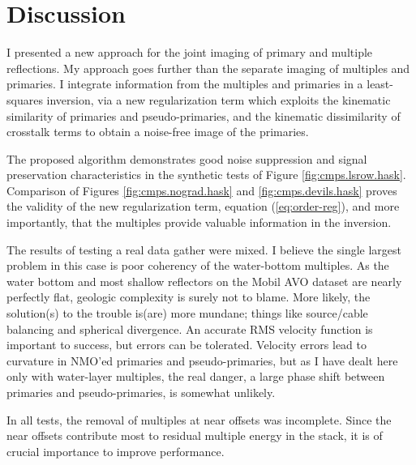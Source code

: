 \section{Discussion}
I presented a new approach for the joint imaging of primary and multiple reflections.  
My approach goes further than the separate imaging of multiples and primaries.  I integrate information
from the multiples and primaries in a least-squares inversion, via a new regularization term which
exploits the kinematic similarity of primaries and pseudo-primaries, and the kinematic dissimilarity
of crosstalk terms to obtain a noise-free image of the primaries.
\par
The proposed algorithm demonstrates good noise suppression and signal preservation characteristics in 
the synthetic tests of Figure \ref{fig:cmps.lsrow.hask}.  Comparison of Figures \ref{fig:cmps.nograd.hask}
and \ref{fig:cmps.devils.hask} proves the validity of the new regularization term, equation 
(\ref{eq:order-reg}), and more importantly, that the multiples provide valuable information in the inversion.
\par
The results of testing a real data gather were mixed.  I believe the single largest problem in this case is
poor coherency of the water-bottom multiples.  As the water bottom and most shallow reflectors on the
Mobil AVO dataset are nearly perfectly flat, geologic complexity is surely not to blame.  More likely, the
solution(s) to the trouble is(are) more mundane; things like source/cable balancing and spherical 
divergence.  An accurate RMS velocity function is important to success, but errors can be tolerated.   
Velocity errors lead to curvature in NMO'ed primaries and pseudo-primaries, but as I have dealt here only 
with water-layer multiples, the real danger, a large phase shift between primaries and pseudo-primaries,
is somewhat unlikely.
\par
In all tests, the removal of multiples at near offsets was incomplete.  Since the near offsets contribute
most to residual multiple energy in the stack, it is of crucial importance to improve performance.  

